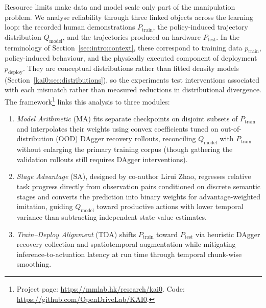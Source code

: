 Resource limits make data and model scale only part of the manipulation problem. We analyse reliability through three linked objects across the learning loop: the recorded human demonstrations $P_{\mathrm{train}}$, the policy-induced trajectory distribution $Q_{\mathrm{model}}$, and the trajectories produced on hardware $P_{\mathrm{test}}$. In the terminology of Section~\ref{sec:intro:context}, these correspond to training data $p_{\mathrm{train}}$, policy-induced behaviour, and the physically executed component of deployment $p_{\mathrm{deploy}}$. They are conceptual distributions rather than fitted density models (Section~\ref{kai0:sec:distributions}), so the experiments test interventions associated with each mismatch rather than measured reductions in distributional divergence. The \chiz framework\footnote{Project page: \url{https://mmlab.hk/research/kai0}. Code: \url{https://github.com/OpenDriveLab/KAI0}.} links this analysis to three modules:
\begin{enumerate}[label=(\alph*)]
  \item \emph{Model Arithmetic} (MA) fits separate checkpoints on disjoint subsets of $P_{\mathrm{train}}$ and interpolates their weights using convex coefficients tuned on out-of-distribution (OOD) DAgger recovery rollouts, reconciling $Q_{\mathrm{model}}$ with $P_{\mathrm{train}}$ without enlarging the primary training corpus (though gathering the validation rollouts still requires DAgger interventions).
  \item \emph{Stage Advantage} (SA), designed by co-author Lirui Zhao, regresses relative task progress directly from observation pairs conditioned on discrete semantic stages and converts the prediction into binary weights for advantage-weighted imitation, guiding $Q_{\mathrm{model}}$ toward productive actions with lower temporal variance than subtracting independent state-value estimates.
  \item \emph{Train--Deploy Alignment} (TDA) shifts $P_{\mathrm{train}}$ toward $P_{\mathrm{test}}$ via heuristic DAgger recovery collection and spatiotemporal augmentation while mitigating inference-to-actuation latency at run time through temporal chunk-wise smoothing.
\end{enumerate}

